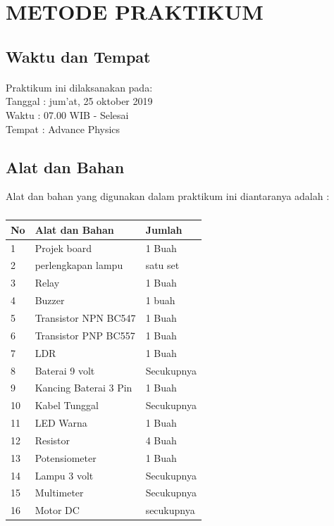 \documentclass[12pt,a4paper]{article}
\begin{document}
\newpage
\section{METODE PRAKTIKUM}
\subsection{Waktu dan Tempat}
\paragraph{ }
Praktikum ini dilaksanakan pada:
\\ 		Tanggal : jum'at, 25 oktober 2019
\\ 		Waktu : 07.00 WIB - Selesai
\\ 		Tempat : Advance Physics 


\subsection{Alat dan Bahan}
Alat dan bahan yang digunakan dalam praktikum ini diantaranya adalah : 
\subparagraph*{ }
\begin{tabular}{|l|l|l|}  \hline
No & Alat dan Bahan  & Jumlah  \\ \hline
1  & Projek board & 1 Buah \\ \hline
2  & perlengkapan lampu & satu set \\ \hline
3  & Relay & 1 Buah \\ \hline
4  & Buzzer & 1 buah  \\ \hline
5  & Transistor NPN BC547 & 1 Buah \\ \hline
6  & Transistor PNP BC557 & 1 Buah \\ \hline
7  & LDR & 1 Buah \\ \hline
8  & Baterai 9 volt & Secukupnya \\ \hline
9  & Kancing Baterai 3 Pin & 1 Buah \\ \hline
10 & Kabel Tunggal  & Secukupnya \\ \hline
11 & LED Warna & 1 Buah \\ \hline
12 & Resistor  & 4 Buah \\ \hline
13 & Potensiometer & 1 Buah \\ \hline
14 & Lampu 3 volt & Secukupnya \\ \hline
15 & Multimeter & Secukupnya \\ \hline
16 & Motor DC   & secukupnya \\  \hline

\end{tabular}
\end{document}
